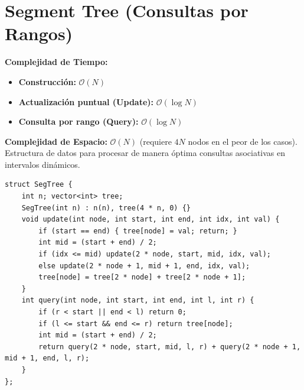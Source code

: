 \documentclass[10pt,twocolumn,letterpaper]{report}
\begin{document}
\section{Segment Tree (Consultas por Rangos)}
\textbf{Complejidad de Tiempo:}
\begin{itemize}
    \item \textbf{Construcción:} $\mathcal{O}(N)$
    \item \textbf{Actualización puntual (Update):} $\mathcal{O}(\log N)$
    \item \textbf{Consulta por rango (Query):} $\mathcal{O}(\log N)$
\end{itemize}
\textbf{Complejidad de Espacio:} $\mathcal{O}(N)$ (requiere $4N$ nodos en el peor de los casos). \\
Estructura de datos para procesar de manera óptima consultas asociativas en intervalos dinámicos.
\begin{lstlisting}
struct SegTree {
    int n; vector<int> tree;
    SegTree(int n) : n(n), tree(4 * n, 0) {}
    void update(int node, int start, int end, int idx, int val) {
        if (start == end) { tree[node] = val; return; }
        int mid = (start + end) / 2;
        if (idx <= mid) update(2 * node, start, mid, idx, val);
        else update(2 * node + 1, mid + 1, end, idx, val);
        tree[node] = tree[2 * node] + tree[2 * node + 1];
    }
    int query(int node, int start, int end, int l, int r) {
        if (r < start || end < l) return 0;
        if (l <= start && end <= r) return tree[node];
        int mid = (start + end) / 2;
        return query(2 * node, start, mid, l, r) + query(2 * node + 1, mid + 1, end, l, r);
    }
};
\end{lstlisting}
\end{document}
